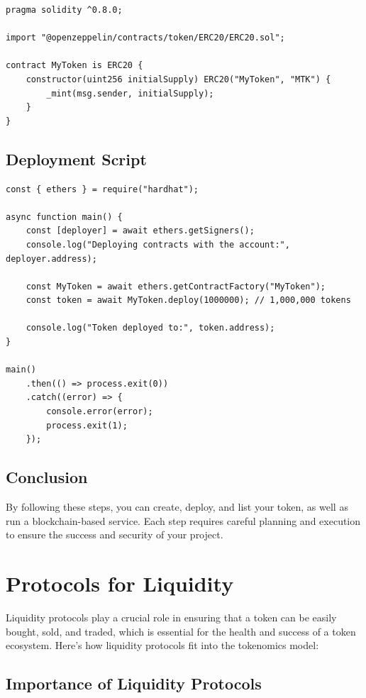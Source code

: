 \documentclass{tufte-handout}
\begin{document}
\begin{verbatim}
pragma solidity ^0.8.0;

import "@openzeppelin/contracts/token/ERC20/ERC20.sol";

contract MyToken is ERC20 {
    constructor(uint256 initialSupply) ERC20("MyToken", "MTK") {
        _mint(msg.sender, initialSupply);
    }
}
\end{verbatim}

\subsection*{Deployment Script}

\begin{verbatim}
const { ethers } = require("hardhat");

async function main() {
    const [deployer] = await ethers.getSigners();
    console.log("Deploying contracts with the account:", deployer.address);

    const MyToken = await ethers.getContractFactory("MyToken");
    const token = await MyToken.deploy(1000000); // 1,000,000 tokens

    console.log("Token deployed to:", token.address);
}

main()
    .then(() => process.exit(0))
    .catch((error) => {
        console.error(error);
        process.exit(1);
    });
\end{verbatim}

\subsection*{Conclusion}

By following these steps, you can create, deploy, and list your token, as well as run a blockchain-based service.
Each step requires careful planning and execution to ensure the success and security of your project.

\section*{Protocols for Liquidity}

Liquidity protocols play a crucial role in ensuring that a token can be easily bought, sold, and traded, which is essential
for the health and success of a token ecosystem. Here's how liquidity protocols fit into the tokenomics model:

\subsection*{Importance of Liquidity Protocols}
\end{document}
